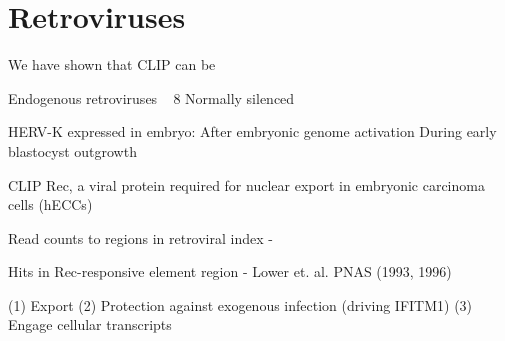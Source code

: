 \section{Retroviruses}

We have shown that CLIP can be 

Endogenous retroviruses 
~ 8%
Normally silenced

HERV-K expressed in embryo:
After embryonic genome activation
During early blastocyst outgrowth

CLIP Rec, a viral protein
required for nuclear export in 
embryonic carcinoma cells (hECCs)

Read counts to regions in retroviral index  -

Hits in Rec-responsive element region -
Lower et. al. PNAS (1993, 1996)


(1) Export
(2) Protection against  exogenous infection (driving IFITM1)
(3) Engage cellular transcripts